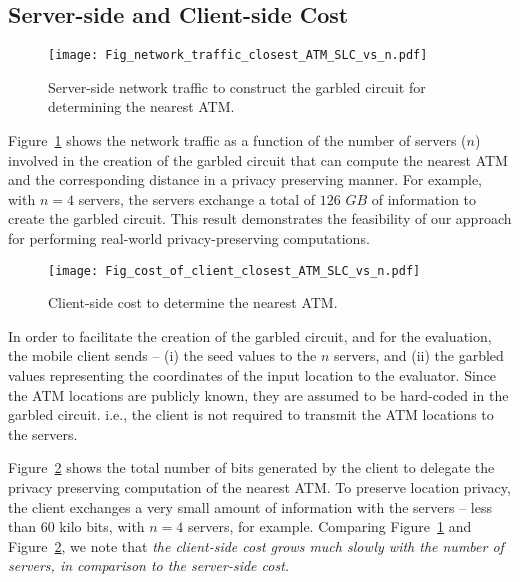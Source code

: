 \documentclass[10pt,journal,cspaper,compsoc]{IEEEtran}
\begin{document}
\subsection{Server-side and Client-side Cost}

\begin{figure}[t]
\centering
\texttt{[image: Fig\_network\_traffic\_closest\_ATM\_SLC\_vs\_n.pdf]}
\caption{Server-side network traffic to construct the garbled circuit for determining the nearest ATM.}\label{fig_server_side_network_traffic_closest_ATM}
\end{figure}


Figure~\ref{fig_server_side_network_traffic_closest_ATM} shows the network traffic as a function of the number of servers ($n$) involved in the creation of the garbled circuit that can compute the nearest ATM and the corresponding distance in a privacy preserving manner. For example, with $n=4$ servers, the servers exchange a total of $126$ $GB$ of information to create the garbled circuit. This result demonstrates the feasibility of our approach for performing real-world privacy-preserving computations.


\begin{figure}[t]
\centering
\texttt{[image: Fig\_cost\_of\_client\_closest\_ATM\_SLC\_vs\_n.pdf]}
\caption{Client-side cost to determine the nearest ATM.}\label{fig_client_side_cost_closest_ATM}
\end{figure}


In order to facilitate the creation of the garbled circuit, and for the evaluation, the mobile client sends -- (i) the seed values to the $n$ servers, and (ii) the garbled values representing the coordinates of the input location to the evaluator. Since the ATM locations are publicly known, they are assumed to be hard-coded in the garbled circuit. i.e., the client is not required to transmit the ATM locations to the servers.


Figure~\ref{fig_client_side_cost_closest_ATM} shows the total number of bits generated by the client to delegate the privacy preserving computation of the nearest ATM. To preserve location privacy, the client exchanges a very small amount of information with the servers -- less than $60$ kilo bits, with $n=4$ servers, for example. Comparing Figure~\ref{fig_server_side_network_traffic_closest_ATM} and Figure~\ref{fig_client_side_cost_closest_ATM}, we note that {\em the client-side cost grows much slowly with the number of servers, in comparison to the server-side cost.}
\end{document}
